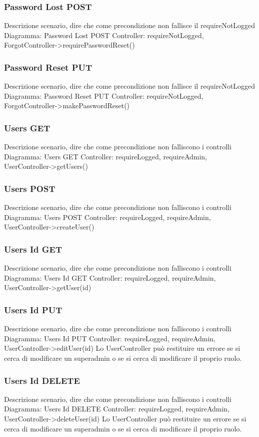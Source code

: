 \subsubsection{Password Lost POST}
Descrizione scenario, dire che come precondizione non fallisce il requireNotLogged
Diagramma: Password Lost POST
Controller: requireNotLogged, ForgotController->requirePasswordReset()

\subsubsection{Password Reset PUT}
Descrizione scenario, dire che come precondizione non fallisce il requireNotLogged
Diagramma: Password Reset PUT
Controller: requireNotLogged, ForgotController->makePasswordReset()

\subsubsection{Users GET}
Descrizione scenario, dire che come precondizione non falliscono i controlli
Diagramma: Users GET
Controller: requireLogged, requireAdmin, UserController->getUsers()

\subsubsection{Users POST}
Descrizione scenario, dire che come precondizione non falliscono i controlli
Diagramma: Users POST
Controller: requireLogged, requireAdmin, UserController->createUser()

\subsubsection{Users Id GET}
Descrizione scenario, dire che come precondizione non falliscono i controlli
Diagramma: Users Id GET
Controller: requireLogged, requireAdmin, UserController->getUser(id)

\subsubsection{Users Id PUT}
Descrizione scenario, dire che come precondizione non falliscono i controlli
Diagramma: Users Id PUT
Controller: requireLogged, requireAdmin, UserController->editUser(id)
Lo UserController può restituire un errore se si cerca di modificare un superadmin o se si cerca di modificare il proprio ruolo.

\subsubsection{Users Id DELETE}
Descrizione scenario, dire che come precondizione non falliscono i controlli
Diagramma: Users Id DELETE
Controller: requireLogged, requireAdmin, UserController->deleteUser(id)
Lo UserController può restituire un errore se si cerca di modificare un superadmin o se si cerca di modificare il proprio ruolo.

